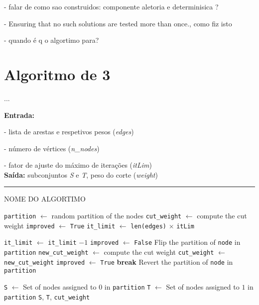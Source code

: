 \documentclass[mirror, portugues]{revdetua}
\begin{document}
- falar de como sao construidos: componente aletoria e determinisica ?

- Ensuring that no such solutions are tested more than once., como fiz isto

- quando é q o algortimo para?


\section{Algoritmo de 3}

...

\begin{algorithm}[H]
\raggedright
\textbf{Entrada:}

- lista de arestas e respetivos pesos (\textit{edges})

- número de vértices (\textit{n\_nodes})

- fator de ajuste do máximo de iterações (\textit{itLim})\\
\textbf{Saída:} subconjuntos \textit{S} e \textit{T}, peso do corte (\textit{weight}) \\
\hrule 
\caption{NOME DO ALGORTIMO}
\begin{algorithmic}[1]
    \State \texttt{partition} $\gets$ random partition of the nodes
    \State \texttt{cut\_weight} $\gets$ compute the cut weight
    \State \texttt{improved} $\gets$ \texttt{True}
    \State \texttt{it\_limit} $\gets$ \texttt{len(edges)} \ensuremath{\times} \texttt{itLim}

        \State \texttt{it\_limit} $\gets$ \texttt{it\_limit} $ - 1$
        \State \texttt{improved} $\gets$ \texttt{False}
            \State Flip the partition of \texttt{node} in \texttt{partition}
            \State \texttt{new\_cut\_weight} $\gets$ compute the cut weight
                \State \texttt{cut\_weight} $\gets$ \texttt{new\_cut\_weight}
                \State \texttt{improved} $\gets$ \texttt{True}
                \State \textbf{break}  
            \EndIf
            \State Revert the partition of \texttt{node} in \texttt{partition}
        \EndFor
    \EndWhile

    \State \texttt{S} $\gets$ Set of nodes assigned to $0$ in \texttt{partition}
    \State \texttt{T} $\gets$ Set of nodes assigned to $1$ in \texttt{partition}
    \Return \texttt{S}, \texttt{T}, \texttt{cut\_weight}
\end{algorithmic}
\end{algorithm}
    
\end{document}
